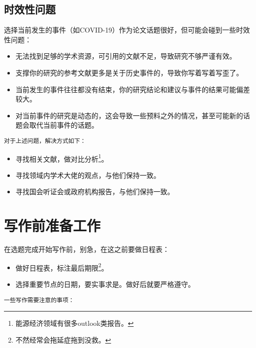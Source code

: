 \documentclass[cn,hazy,blue,14pt,screen]{elegantnote} %
\begin{document}
\subsection{时效性问题}

选择当前发生的事件（如COVID-19）作为论文话题很好，但可能会碰到一些时效性问题：

\begin{itemize}
  \item 无法找到足够的学术资源，可引用的文献不足，导致研究不够严谨有效。
  \item 支撑你的研究的参考文献更多是关于历史事件的，导致你写着写着写歪了。
  \item 当前发生的事件往往都没有结束，你的研究结论和建议与事件的结果可能偏差较大。
  \item 对当前事件的研究是动态的，这会导致一些预料之外的情况，甚至可能新的话题会取代当前事件的话题。
\end{itemize}

\lstinline{对于上述问题，解决方式如下：}

\begin{itemize}
  \item 寻找相关文献，做对比分析\footnote{能源经济领域有很多outlook类报告。}。
  \item 寻找领域内学术大佬的观点，与他们保持一致。
  \item 寻找国会听证会或政府机构报告，与他们保持一致。
\end{itemize}

\newpage

\section{写作前准备工作}

在选题完成开始写作前，别急，在这之前要做日程表：

\begin{itemize}
  \item 做好日程表，标注最后期限\footnote{不然经常会拖延症拖到没救。}。
  \item 选择重要节点的日期，要实事求是。做好后就要严格遵守。
\end{itemize}

\lstinline{一些写作需要注意的事项：}
\end{document}
